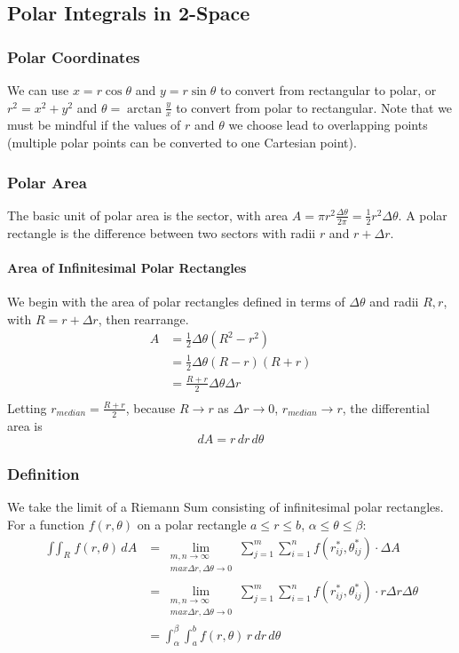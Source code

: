\documentclass{article}
\begin{document}
\subsection{Polar Integrals in 2-Space}
\subsubsection{Polar Coordinates}
We can use $x=r\cos{\theta}$ and $y=r\sin{\theta}$ to convert from rectangular to polar, or $r^2=x^2+y^2$ and $\theta=\arctan{\frac{y}{x}}$ to convert from polar to rectangular. Note that we must be mindful if the values of $r$ and $\theta$ we choose lead to overlapping points (multiple polar points can be converted to one Cartesian point).

\subsubsection{Polar Area}
The basic unit of polar area is the sector, with area $A=\pi{r^2}\frac{\Delta\theta}{2\pi}=\frac{1}{2}r^2\Delta\theta$. A polar rectangle is the difference between two sectors with radii $r$ and $r+\Delta{r}$.

\paragraph{Area of Infinitesimal Polar Rectangles}
We begin with the area of polar rectangles defined in terms of $\Delta{\theta}$ and radii $R,r$, with $R=r+\Delta{r}$, then rearrange.
\begin{align*}
    A&=\frac{1}{2}\Delta{\theta}\left(R^2-r^2\right)\\
     &=\frac{1}{2}\Delta{\theta}\left(R-r\right)\left(R+r\right)\\
     &=\frac{R+r}{2}\Delta{\theta}\Delta{r}\\
\end{align*}
Letting $r_{median}=\frac{R+r}{2}$, because $R\to{r}$ as $\Delta{r}\to0$, $r_{median}\to{r}$, the differential area is
$$dA=r\,dr\,d\theta$$

\subsubsection{Definition}
We take the limit of a Riemann Sum consisting of infinitesimal polar rectangles. For a function $f(r,\theta)$ on a polar rectangle $a \le r \le b$, $\alpha \le \theta \le \beta$:
\begin{align*}
    \mathop{\int\int}_Rf(r,\theta)\,dA &=\lim_{\substack{m,n\to\infty\\max\Delta{r},\Delta{\theta}\to0}}\sum_{j=1}^m\sum_{i=1}^nf(r_{ij}^*,\theta_{ij}^*)\cdot\Delta A\\
    &=\lim_{\substack{m,n\to\infty\\max\Delta{r},\Delta{\theta}\to0}}\sum_{j=1}^m\sum_{i=1}^nf(r_{ij}^*,\theta_{ij}^*)\cdot r\Delta r\Delta\theta\\
    &=\int_\alpha^\beta\int_a^bf(r,\theta)\,r\,dr\,d\theta
\end{align*}
\end{document}
